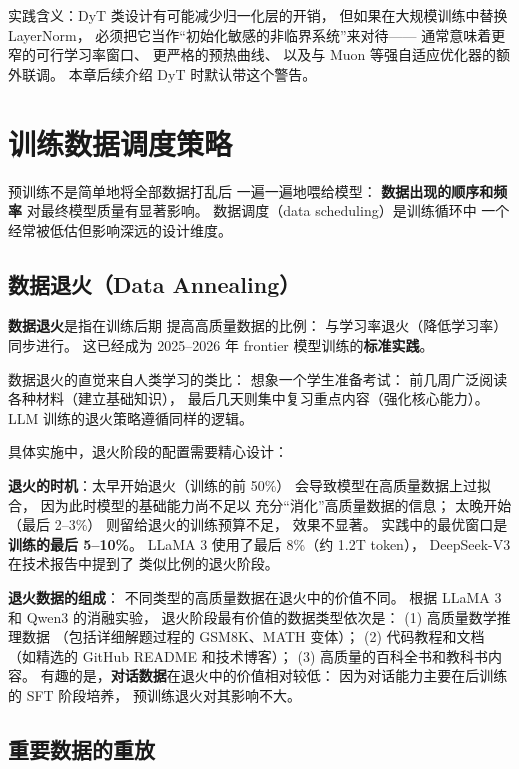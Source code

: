实践含义：DyT 类设计有可能减少归一化层的开销，
但如果在大规模训练中替换 LayerNorm，
必须把它当作“初始化敏感的非临界系统”来对待——
通常意味着更窄的可行学习率窗口、
更严格的预热曲线、
以及与 Muon 等强自适应优化器的额外联调。
本章后续介绍 DyT 时默认带这个警告。

\section{训练数据调度策略}
\label{sec:data-scheduling}

预训练不是简单地将全部数据打乱后
一遍一遍地喂给模型：
\textbf{数据出现的顺序和频率}
对最终模型质量有显著影响。
数据调度（data scheduling）是训练循环中
一个经常被低估但影响深远的设计维度。

\subsection{数据退火（Data Annealing）}

\textbf{数据退火}是指在训练后期
提高高质量数据的比例：
与学习率退火（降低学习率）同步进行。
这已经成为 2025--2026 年 frontier 模型训练的\textbf{标准实践}。

数据退火的直觉来自人类学习的类比：
想象一个学生准备考试：
前几周广泛阅读各种材料（建立基础知识），
最后几天则集中复习重点内容（强化核心能力）。
LLM 训练的退火策略遵循同样的逻辑。

具体实施中，退火阶段的配置需要精心设计：

\textbf{退火的时机}：太早开始退火（训练的前 50\%）
会导致模型在高质量数据上过拟合，
因为此时模型的基础能力尚不足以
充分“消化”高质量数据的信息；
太晚开始（最后 2--3\%）
则留给退火的训练预算不足，
效果不显著。
实践中的最优窗口是\textbf{训练的最后 5--10\%}。
LLaMA 3 使用了最后 8\%（约 1.2T token），
DeepSeek-V3 在技术报告中提到了
类似比例的退火阶段。

\textbf{退火数据的组成}：
不同类型的高质量数据在退火中的价值不同。
根据 LLaMA 3 和 Qwen3 的消融实验，
退火阶段最有价值的数据类型依次是：
(1) 高质量数学推理数据
（包括详细解题过程的 GSM8K、MATH 变体）；
(2) 代码教程和文档
（如精选的 GitHub README 和技术博客）；
(3) 高质量的百科全书和教科书内容。
有趣的是，\textbf{对话数据}在退火中的价值相对较低：
因为对话能力主要在后训练的 SFT 阶段培养，
预训练退火对其影响不大。

\subsection{重要数据的重放}

